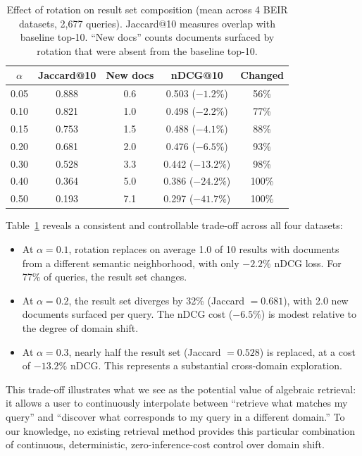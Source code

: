\documentclass{article}
\begin{document}
\begin{table}[ht]
\centering
\caption{Effect of rotation on result set composition (mean across 4 BEIR datasets, 2,677 queries). Jaccard@10 measures overlap with baseline top-10. ``New docs'' counts documents surfaced by rotation that were absent from the baseline top-10.}
\label{tab:beir_rotation}
\begin{tabular}{ccccc}
\toprule
$\alpha$ & Jaccard@10 & New docs & nDCG@10 & Changed \\
\midrule
0.05 & 0.888 & 0.6 & 0.503 ($-1.2\%$) & 56\% \\
0.10 & 0.821 & 1.0 & 0.498 ($-2.2\%$) & 77\% \\
0.15 & 0.753 & 1.5 & 0.488 ($-4.1\%$) & 88\% \\
0.20 & 0.681 & 2.0 & 0.476 ($-6.5\%$) & 93\% \\
0.30 & 0.528 & 3.3 & 0.442 ($-13.2\%$) & 98\% \\
0.40 & 0.364 & 5.0 & 0.386 ($-24.2\%$) & 100\% \\
0.50 & 0.193 & 7.1 & 0.297 ($-41.7\%$) & 100\% \\
\bottomrule
\end{tabular}
\end{table}

Table~\ref{tab:beir_rotation} reveals a consistent and controllable trade-off across all four datasets:

\begin{itemize}
\item At $\alpha = 0.1$, rotation replaces on average 1.0 of 10 results with documents from a different semantic neighborhood, with only $-2.2\%$ nDCG loss. For 77\% of queries, the result set changes.

\item At $\alpha = 0.2$, the result set diverges by 32\% (Jaccard $= 0.681$), with 2.0 new documents surfaced per query. The nDCG cost ($-6.5\%$) is modest relative to the degree of domain shift.

\item At $\alpha = 0.3$, nearly half the result set (Jaccard $= 0.528$) is replaced, at a cost of $-13.2\%$ nDCG. This represents a substantial cross-domain exploration.
\end{itemize}

This trade-off illustrates what we see as the potential value of algebraic retrieval: it allows a user to continuously interpolate between ``retrieve what matches my query'' and ``discover what corresponds to my query in a different domain.'' To our knowledge, no existing retrieval method provides this particular combination of continuous, deterministic, zero-inference-cost control over domain shift.
\end{document}
